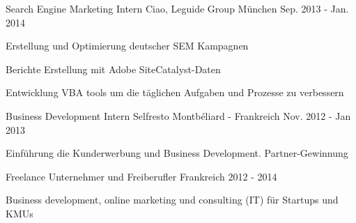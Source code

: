 \begin{cventries}
  \cventry
    {Search Engine Marketing Intern} %
    {Ciao, Leguide Group} %
    {München} %
    {Sep. 2013 - Jan. 2014} %
    {
      \begin{cvitems} %
        \item {Erstellung und Optimierung deutscher SEM Kampagnen}
        \item {Berichte Erstellung mit Adobe SiteCatalyst-Daten}
        \item {Entwicklung VBA tools um die täglichen Aufgaben und Prozesse zu verbessern}
      \end{cvitems}
    }
	\cventry
	{Business Development Intern} %
	{Selfresto} %
	{Montbéliard - Frankreich} %
	{Nov. 2012 - Jan 2013} %
	{
		\begin{cvitems} %
			\item {Einführung die Kunderwerbung und Business Development. Partner-Gewinnung}
		\end{cvitems}
	}
  \cventry
    {Freelance} %
    {Unternehmer und Freiberufler} %
    {Frankreich} %
    {2012 - 2014} %
    {	
      \begin{cvitems} %
      	\item{Business development, online marketing und consulting (IT) für Startups und KMUs}
      \end{cvitems}
    }




\end{cventries}
